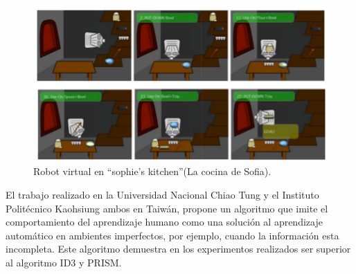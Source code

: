 \begin{figure}[H]
\centering
\includegraphics[width=0.8\columnwidth]{CapituloI/Imagenes/Sparc.png}
\caption{Robot virtual en “sophie’s kitchen”(La cocina de Sofia).}
\label{fig:sparcrob}
\end{figure}


El trabajo realizado en la Universidad Nacional Chiao Tung y el Instituto
 Politécnico Kaohsiung ambos en Taiwán\cite{Chang1996}, propone un algoritmo
 que imite el comportamiento del aprendizaje humano como una solución al
 aprendizaje automático en ambientes imperfectos, por ejemplo, cuando la
 información esta incompleta. Este algoritmo demuestra en los experimentos
 realizados ser superior al algoritmo ID3 y PRISM.